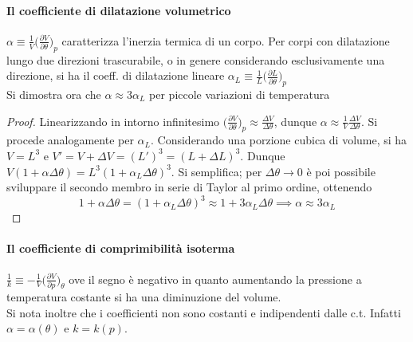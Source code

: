 \documentclass[10pt, oneside]{book}
\newcommand{\ds}{\displaystyle}
\begin{document}
\paragraph{Il coefficiente di dilatazione volumetrico} $\displaystyle \alpha \equiv \frac{1}{V} \bigg(\frac{\partial V}{\partial \theta}\bigg)_p$ caratterizza l'inerzia termica di un corpo. Per corpi con dilatazione lungo due direzioni trascurabile, o in genere considerando esclusivamente una direzione, si ha il coeff. di dilatazione lineare $\displaystyle \alpha_L \equiv \frac{1}{L}\bigg(\frac{\partial L}{\partial \theta}\bigg)_p$
\\Si dimostra ora che $\alpha \approx 3 \alpha_L$ per piccole variazioni di temperatura
\begin{proof}
Linearizzando in intorno infinitesimo $\displaystyle \bigg(\frac{\partial V}{\partial \theta}\bigg)_p \approx \frac{\Delta V}{\Delta \theta}$, dunque $\ds \alpha \approx \frac{1}{V} \frac{\Delta V}{\Delta \theta}$. Si procede analogamente per $\alpha_L$. Considerando una porzione cubica di volume, si ha $V = L^3$ e $V' = V + \Delta V = (L')^3 = (L + \Delta L)^3$. Dunque $\displaystyle V ( 1 + \alpha \Delta \theta) = L^3 (1 + \alpha_L \Delta \theta)^3$. Si semplifica; per $\Delta \theta \rightarrow 0$ è poi possibile sviluppare il secondo membro in serie di Taylor al primo ordine, ottenendo
\[1 + \alpha \Delta \theta = (1 + \alpha_L \Delta \theta)^3 \approx 1 + 3 \alpha_L \Delta \theta \implies \alpha \approx 3 \alpha_L\]
\end{proof}
\paragraph{Il coefficiente di comprimibilità isoterma} $\displaystyle \frac{1}{k} \equiv - \frac{1}{V} \bigg(\frac{\partial V}{\partial p}\bigg)_\theta$ ove il segno è negativo in quanto aumentando la pressione a temperatura costante si ha una diminuzione del volume.
\\Si nota inoltre che i coefficienti non sono costanti e indipendenti dalle c.t. Infatti $\alpha = \alpha(\theta)$ e $k = k(p)$.
\end{document}

